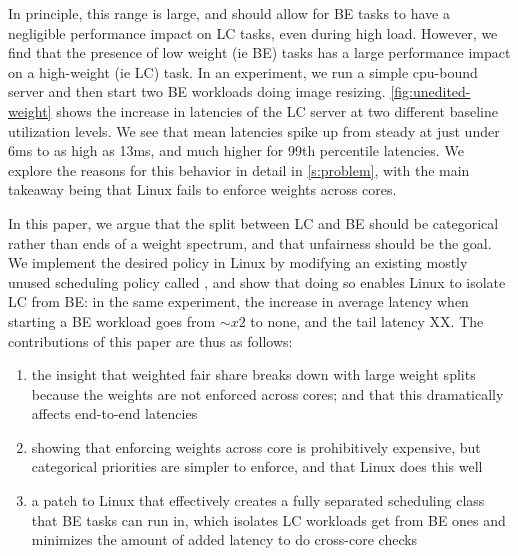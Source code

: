 In principle, this range is large, and should allow for BE tasks to have a
negligible performance impact on LC tasks, even during high load. However, we
find that the presence of low weight (ie BE) tasks has a large performance
impact on a high-weight (ie LC) task. In an experiment, we run a simple
cpu-bound server and then start two BE workloads doing image resizing.
\autoref{fig:unedited-weight} shows the increase in latencies of the LC server
at two different baseline utilization levels. We see that mean latencies spike
up from steady at just under 6ms to as high as 13ms, and much higher for 99th
percentile latencies. We explore the reasons for this behavior in detail in
\autoref{s:problem}, with the main takeaway being that Linux fails to enforce
weights across cores.

In this paper, we argue that the split between LC and BE should be categorical
rather than ends of a weight spectrum, and that unfairness should be the goal.
We implement the desired policy in Linux by modifying an existing mostly unused
scheduling policy called \schedidle{}, and show that doing so enables Linux to
isolate LC from BE: in the same experiment, the increase in average latency when
starting a BE workload goes from $\sim x 2$ to none, and the tail latency XX.
The contributions of this paper are thus as follows: 
\begin{enumerate}
    \item the insight that weighted fair share breaks down with large weight
    splits because the weights are not enforced across cores; and that this
    dramatically affects end-to-end latencies
    \item showing that enforcing weights across core is prohibitively expensive,
    but categorical priorities are simpler to enforce, and that Linux does this
    well
    \item a patch to Linux that effectively creates a fully separated scheduling
    class that BE tasks can run in, which isolates LC workloads get from BE ones
    and minimizes the amount of added latency to do cross-core checks
\end{enumerate}
